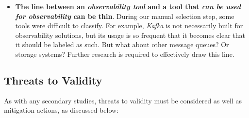 \documentclass[sigconf]{acmart}
\begin{document}
\begin{itemize}
  These were, however, often accompanied by OSS tools, a reminder that some
  of the OSS tools are so ubiquitous that vendors are effectively forced
  to implement support for them, further showing the strength OSS has in
  standardization and interoperability. Practitioners should consider
  prioritizing OSS when adopting observability tooling that needs to
  interoperate, for example, in multi-cloud scenarios.
\item
  \textbf{The line between an \emph{observability tool} and a tool that
  \emph{can be used for observability} can be thin}. During our manual
  selection step, some tools were difficult to classify. For example,
  \emph{Kafka} is not necessarily built for observability solutions, but
  its usage is so frequent that it becomes clear that it should be
  labeled as such. But what about other message queues? Or storage
  systems? Further research is required to effectively draw this line.
\end{itemize}

\subsection{Threats to Validity}\label{threats-to-validity}

As with any secondary studies, threats to validity must be considered as
well as mitigation actions, as discussed below:
\end{document}
